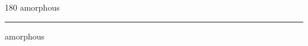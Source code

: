 
\begin{frame}
\begin{center}
\begin{turn}{180}
{\fontsize{2.5cm}{1em}\selectfont amorphous}
\end{turn}
\vspace{1em}\par  
\hrule
\vspace{1em}\par  
{\fontsize{2.5cm}{1em}\selectfont amorphous}
\end{center}
\end{frame}
